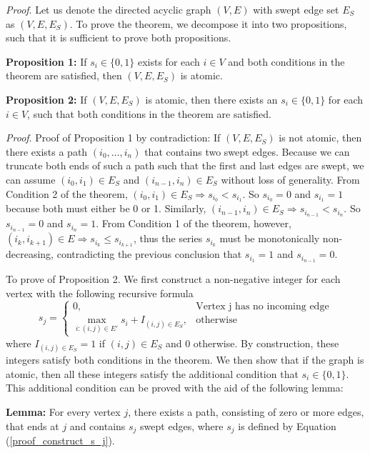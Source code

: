 \documentclass[review]{siamart0216}
\begin{document}
{\em Proof}.
Let us denote the directed acyclic graph $(V,E)$ with swept edge set $E_S$ as
$(V,E,E_S)$.  To prove the theorem, we decompose it into two propositions,
such that it is sufficient to prove both propositions.

{\bf Proposition 1:}
If $s_i \in \{0,1\}$ exists for each $i\in V$ and both conditions in the
theorem are satisfied, then $(V, E, E_S)$ is atomic.

{\bf Proposition 2:}
If $(V, E, E_S)$ is atomic, then there exists an $s_i \in \{0,1\}$
for each $i\in V$, such that both conditions in the
theorem are satisfied.

{\em Proof}.
Proof of Proposition 1 by contradiction: If $(V,E,E_S)$ is not atomic,
then there exists a path $(i_0, \ldots, i_n)$ that contains two swept edges.
Because we can truncate both ends of such a path such that the first and last
edges are swept, we can assume $(i_0,i_1)\in E_S$ and
$(i_{n-1},i_n)\in E_S$ without loss of generality.
From Condition 2 of the theorem,
$(i_0,i_1)\in E_S\Rightarrow s_{i_0} < s_{i_1}$.  So $s_{i_0} = 0$ and
$s_{i_1} = 1$ because both must either be 0 or 1.  Similarly,
$(i_{n-1},i_n)\in E_S\Rightarrow s_{i_{n-1}} < s_{i_n}$.  So $s_{i_{n-1}} = 0$
and $s_{i_n} = 1$.  From Condition 1 of the theorem, however,
$(i_k,i_{k+1})\in E\Rightarrow s_{i_k} \le s_{i_{k+1}}$, thus the series
$s_{i_k}$ must be monotonically non-decreasing, contradicting the previous
    conclusion that $s_{i_1} = 1$ and $s_{i_{n-1}} = 0$. \qquad\endproof 

To prove of Proposition 2. We first construct a non-negative integer for each
vertex with the following recursive formula
\begin{equation} \label{proof_construct_s_j}
    s_j = \begin{cases}
        0, & \mbox{Vertex j has no incoming edge} \\
        \max_{i : (i,j)\in E'} s_i + I_{(i,j)\in E_S} , & \mbox{otherwise}
    \end{cases}
\end{equation}
where $I_{(i,j)\in E_S} = 1$ if $(i,j)\in E_S$ and 0 otherwise.
By construction, these integers satisfy both conditions in the theorem.
We then show that if the graph is atomic, then all these integers
satisfy the additional condition that $s_i \in \{0,1\}$.
This additional condition can be proved with the aid of the following lemma:

{\bf Lemma:} For every vertex $j$, there exists a path, consisting of zero
or more edges, that ends at $j$ and contains $s_j$ swept edges, where
$s_j$ is defined by Equation (\ref{proof_construct_s_j}).
\end{document}
